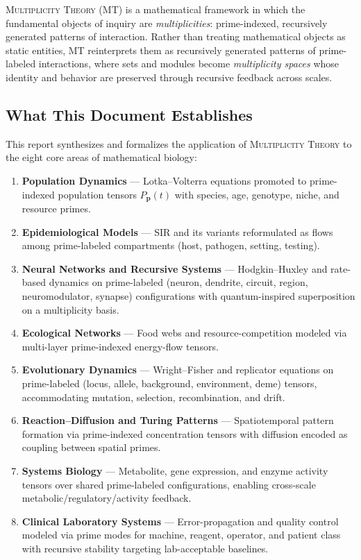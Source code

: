\documentclass[12pt,letterpaper]{article}
\newcommand{\MT}{\textsc{Multiplicity Theory}}
\newcommand{\bp}{\mathbf{p}}
\begin{document}
\MT{} (MT) is a mathematical framework in which the fundamental objects of
inquiry are \emph{multiplicities}: prime-indexed, recursively generated patterns
of interaction. Rather than treating mathematical objects as static entities, MT
reinterprets them as recursively generated patterns of prime-labeled interactions,
where sets and modules become \emph{multiplicity spaces} whose identity and
behavior are preserved through recursive feedback across scales.

\subsection*{What This Document Establishes}

This report synthesizes and formalizes the application of \MT{} to the eight
core areas of mathematical biology:

\begin{enumerate}[leftmargin=*]
  \item \textbf{Population Dynamics} --- Lotka--Volterra equations promoted to
    prime-indexed population tensors $P_{\bp}(t)$ with species, age, genotype,
    niche, and resource primes.
  \item \textbf{Epidemiological Models} --- SIR and its variants reformulated as
    flows among prime-labeled compartments (host, pathogen, setting, testing).
  \item \textbf{Neural Networks and Recursive Systems} --- Hodgkin--Huxley and
    rate-based dynamics on prime-labeled (neuron, dendrite, circuit, region,
    neuromodulator, synapse) configurations with quantum-inspired superposition
    on a multiplicity basis.
  \item \textbf{Ecological Networks} --- Food webs and resource-competition
    modeled via multi-layer prime-indexed energy-flow tensors.
  \item \textbf{Evolutionary Dynamics} --- Wright--Fisher and replicator
    equations on prime-labeled (locus, allele, background, environment, deme)
    tensors, accommodating mutation, selection, recombination, and drift.
  \item \textbf{Reaction--Diffusion and Turing Patterns} --- Spatiotemporal
    pattern formation via prime-indexed concentration tensors with
    diffusion encoded as coupling between spatial primes.
  \item \textbf{Systems Biology} --- Metabolite, gene expression, and enzyme
    activity tensors over shared prime-labeled configurations, enabling
    cross-scale metabolic/regulatory/activity feedback.
  \item \textbf{Clinical Laboratory Systems} --- Error-propagation and quality
    control modeled via prime modes for machine, reagent, operator, and patient
    class with recursive stability targeting lab-acceptable baselines.
\end{enumerate}
\end{document}
